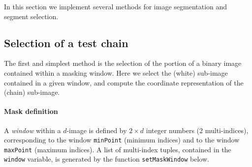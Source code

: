 \documentclass[11pt,oneside]{article}	%
\begin{document}
In this section we implement several methods for image segmentation and segment selection. 

\subsection{Selection of a test chain}

The first and simplest method is the selection of the portion of a binary image contained within a masking window.
Here we select the (white) sub-image contained in a given window, and compute the coordinate representation of the (chain) sub-image.

\paragraph{Mask definition}

A \emph{window} within a $d$-image is defined by $2\times d$ integer numbers (2 multi-indices), corresponding to the window  \texttt{minPoint} (minimum indices) and to the window \texttt{maxPoint} (maximum indices). A list of multi-index tuples, contained in the \texttt{window} variable, is generated by the function \texttt{setMaskWindow} below.
\end{document}

